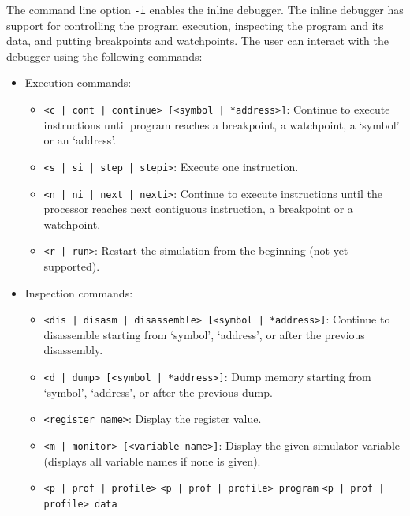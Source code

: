 The command line option \texttt{-i} enables the inline debugger. The inline debugger has support for controlling the program execution, inspecting the program and its data, and putting breakpoints and watchpoints. The user can interact with the debugger using the following commands:
\begin{itemize}
\item Execution commands:
	\begin{itemize}
	\item \texttt{<c | cont | continue> [<symbol | *address>]}: \newline
	Continue to execute instructions until program reaches a breakpoint, a watchpoint, a `symbol' or an `address'.
	\item \texttt{<s | si | step | stepi>}: \newline
	Execute one instruction.
	\item \texttt{<n | ni | next | nexti>}: \newline
	Continue to execute instructions until the processor reaches next contiguous instruction, a breakpoint or a watchpoint.
	\item \texttt{<r | run>}: \newline
	Restart the simulation from the beginning (not yet supported).
	\end{itemize}
\item Inspection commands:
	\begin{itemize}
	\item \texttt{<dis | disasm | disassemble> [<symbol | *address>]}: \newline
	Continue to disassemble starting from `symbol', `address', or after the previous disassembly.
	\item \texttt{<d | dump> [<symbol | *address>]}: \newline
	Dump memory starting from `symbol', `address', or after the previous dump.
	\item \texttt{<register name>}: \newline
	Display the register value.
	\item \texttt{<m | monitor> [<variable name>]}: \newline
	Display the given simulator variable (displays all variable names if none is given).
	\item \texttt{<p | prof | profile>} \newline
	\texttt{<p | prof | profile> program} \newline
	\texttt{<p | prof | profile> data} \newline

\end{itemize}
\end{itemize}
